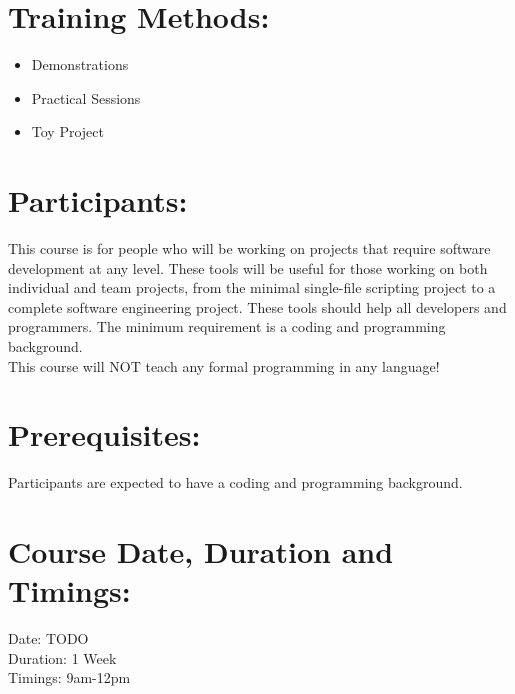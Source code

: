 \documentclass[a4paper,11pt]{article}
\begin{document}
\section{Training Methods:}
\begin{itemize}
		\item Demonstrations
		\item Practical Sessions
		\item Toy Project
\end{itemize}

\section{Participants:}
This course is for people who will be working on projects that require software development at any level. These tools will be useful for those working on both individual and team projects, from the minimal single-{f}ile scripting project to a complete software engineering project. These tools should help all developers and programmers. The minimum requirement is a coding and programming background.\\
This course will NOT teach any formal programming in any language!

\section{Prerequisites:}
Participants are expected to have a coding and programming background.

\section{Course Date, Duration and Timings:}
Date: TODO\\
Duration: 1 Week\\
Timings: 9am-12pm
\end{document}

